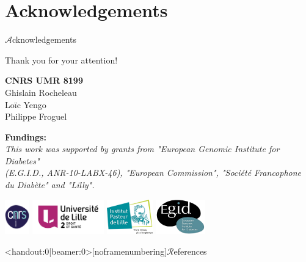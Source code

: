 \documentclass[10pt, xcolors={RGB}, hyperref={pdfpagelabels=false,
        colorlinks=true,
        pdftex=true,
        bookmarks=true,
        bookmarksopen=true,
        hyperfootnotes=true}]{beamer}
\newcommand\green[1]{{\color{springgreen3}\textbf{#1}}}
\newcommand\lettrine[1]{{\huge{$\mathcal{#1}$}}}
\begin{document}
\section{Acknowledgements}
\begin{frame}{\lettrine{A}cknowledgements}
\begin{center}
    \vspace{0.5cm}
    {\huge\par{Thank you for your attention!}}
    \vspace{0.75cm}
    {\scriptsize
        \par{%
            \green{CNRS UMR 8199}\\
            Ghislain Rocheleau\\
            Loïc Yengo\\
            Philippe Froguel\\
        }
        \vspace{1cm}
        \par{%
        \begin{singlespace*}
            \par{\green{Fundings:}\\
                \textit{
                    This work was supported by grants from "European Genomic Institute for Diabetes"\\
                    (E.G.I.D., ANR-10-LABX-46), "European Commission", "Société Francophone du Diabète" and "Lilly".
                }
            }
        \end{singlespace*}
        }
        \vspace{0.75cm}
        \par{%
            \includegraphics[height=1.5cm, keepaspectratio]{figures/logo_cnrs.pdf}\hspace{1cm}
            \includegraphics[height=1.5cm, keepaspectratio]{figures/UL2-WEB-2014.png}\hspace{1cm}
            \includegraphics[height=1.5cm, keepaspectratio]{figures/Institut-Pasteur-de-Lille.png}\hspace{1cm}
            \includegraphics[height=1.5cm, keepaspectratio]{figures/logo_egid.pdf}%
        }
    }
\end{center}
\end{frame}

\begin{frame}<handout:0|beamer:0>[noframenumbering]{\lettrine{R}eferences}
    
\end{frame}
\end{document}
